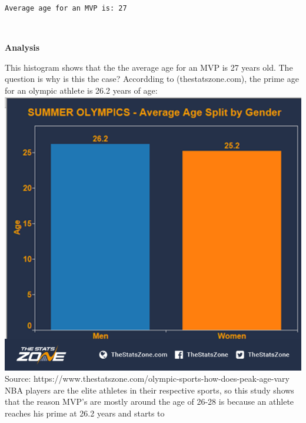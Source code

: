 \documentclass[11pt]{article}
\makeatletter
\def\maxwidth{\ifdim\Gin@nat@width>\linewidth\linewidth
    \else\Gin@nat@width\fi}
\let\Oldincludegraphics\includegraphics
\renewcommand{\includegraphics}[1]{\Oldincludegraphics[width=.8\maxwidth]{#1}}
\makeatother
\begin{document}
    \begin{Verbatim}[commandchars=\\\{\}]
 Average age for an MVP is: 27

    \end{Verbatim}

    \begin{center}
    \end{center}
    { \hspace*{\fill} \\}
    
    \textbf{Analysis} \newline

This histogram shows that the the average age for an MVP is 27 years
old. The question is why is this the case? Accordding to
(thestatszone.com), the prime age for an olympic athlete is 26.2 years
of age: \newline     \includegraphics{age_olympics.png} \newline 
Source:
https://www.thestatszone.com/olympic-sports-how-does-peak-age-vary
\newline
\newline
NBA players are the elite athletes in their respective sports, so this
study shows that the reason MVP's are mostly around the age of 26-28 is
because an athlete reaches his prime at 26.2 years and starts to
\end{document}
